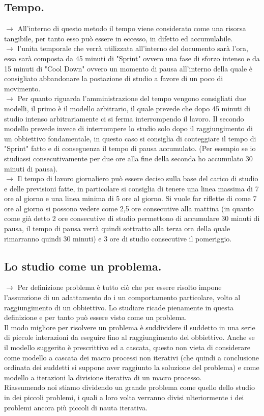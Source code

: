 \documentclass[11pt,a4paper]{article}
\begin{document}
\subsection{Tempo.}
$\rightarrow$ All'interno di questo metodo il tempo viene considerato come una risorsa tangibile, per tanto esso può essere in eccesso, in difetto ed accumulabile.\\
$\rightarrow$ l'unita temporale che verrà utilizzata all'interno del documento sarà l'ora, essa sarà composta da 45 minuti di "Sprint" ovvero una fase di sforzo intenso e da 15 minuti di "Cool Down" ovvero un momento di pausa all'interno della quale è consigliato abbandonare la postazione di studio a favore di un poco di movimento. \\
$\rightarrow$ Per quanto riguarda l'amministrazione del tempo vengono consigliati due modelli, il primo è il  modello arbitrario, il quale prevede che dopo 45 minuti di studio intenso arbitrariamente ci si ferma interrompendo il lavoro. Il secondo modello prevede invece di interrompere lo studio solo dopo il raggiungimento di un obbiettivo fondamentale, in questo caso si consiglia di conteggiare il tempo di "Sprint" fatto e di conseguenza il tempo di pausa accumulato. (Per esempio se io studiassi consecutivamente per due ore alla fine della seconda ho accumulato 30 minuti di pausa).\\
$\rightarrow$ Il tempo di lavoro giornaliero può essere deciso sulla base del carico di studio e delle previsioni fatte, in particolare si consiglia di tenere una linea massima di 7 ore al giorno e una linea minima di 5 ore al giorno. Si vuole far riflette di come 7 ore al giorno si possono vedere come 2,5 ore consecutive alla mattina (in quanto come già detto 2 ore consecutive di studio permettono di accumulare 30 minuti di pausa, il tempo di pausa verrà quindi sottratto alla terza ora della quale rimarranno quindi 30 minuti) e 3 ore di studio consecutive il pomeriggio.\\

\subsection{Lo studio come un problema.} 
$\rightarrow$ Per definizione problema è tutto ciò che per essere risolto impone l'assunzione di un adattamento do i un comportamento particolare, volto al raggiungimento di un obbiettivo. Lo studiare ricade pienamente in questa definizione e per tanto può essere visto come un problema.\\
Il modo migliore per risolvere un problema è suddividere il suddetto in una serie di piccole interazioni da eseguire fino al raggiungimento del obbiettivo. Anche se il modello suggerito è prescrittivo ed a cascata, questo non vieta di considerare come modello a cascata dei macro processi non iterativi (che quindi a conclusione ordinata dei suddetti si suppone aver raggiunto la soluzione del problema) e come modello a iterazioni la divisione iterativa di un macro processo.\\
Riassumendo noi stiamo dividendo un grande problema come quello dello studio in dei piccoli problemi, i quali a loro volta verranno divisi ulteriormente i dei problemi ancora più piccoli di nauta iterativa.\\ 
\end{document}
